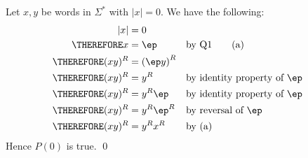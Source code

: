         Let $x, y$ be words in $\Sigma^*$ with $|x| = 0$.
We have the following:
\begin{align*}
              |x| &= 0                                                 \\
\THEREFORE      x &= \ep        & & \text{by Q1} \tag{a}     \\
\THEREFORE (xy)^R &= \left( \ep y \right)^R  & &                          \\
\THEREFORE (xy)^R &= y^R                  & & \text{by identity property of $\ep$}  \\
\THEREFORE (xy)^R &= y^R \ep              & & \text{by identity property of $\ep$}  \\
\THEREFORE (xy)^R &= y^R \ep^R  & & \text{by reversal of $\ep$}  \\
\THEREFORE (xy)^R &= y^R x^R & & \text{by (a)} 
\end{align*}
Hence $P(0)$ is true.
\qed
\\

